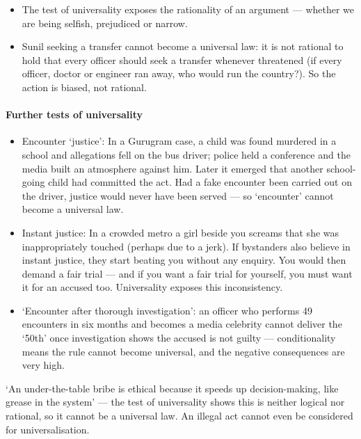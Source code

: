 \begin{CriticalPoint}
\begin{itemize}
\item The test of universality exposes the rationality of an argument --- whether we are being selfish, prejudiced or narrow.
\item Sunil seeking a transfer cannot become a universal law: it is not rational to hold that every officer should seek a transfer whenever threatened (if every officer, doctor or engineer ran away, who would run the country?). So the action is biased, not rational.
\end{itemize}
\end{CriticalPoint}

\paragraph{Further tests of universality}

\begin{ExampleBox}
\begin{itemize}
\item Encounter `justice': In a Gurugram case, a child was found murdered in a school and allegations fell on the bus driver; police held a conference and the media built an atmosphere against him. Later it emerged that another school-going child had committed the act. Had a fake encounter been carried out on the driver, justice would never have been served --- so `encounter' cannot become a universal law.
\item Instant justice: In a crowded metro a girl beside you screams that she was inappropriately touched (perhaps due to a jerk). If bystanders also believe in instant justice, they start beating you without any enquiry. You would then demand a fair trial --- and if you want a fair trial for yourself, you must want it for an accused too. Universality exposes this inconsistency.
\item `Encounter after thorough investigation': an officer who performs 49 encounters in six months and becomes a media celebrity cannot deliver the `50th' once investigation shows the accused is not guilty --- conditionality means the rule cannot become universal, and the negative consequences are very high.
\end{itemize}
\end{ExampleBox}

\begin{CriticalPoint}
`An under-the-table bribe is ethical because it speeds up decision-making, like grease in the system' --- the test of universality shows this is neither logical nor rational, so it cannot be a universal law. An illegal act cannot even be considered for universalisation.
\end{CriticalPoint}

